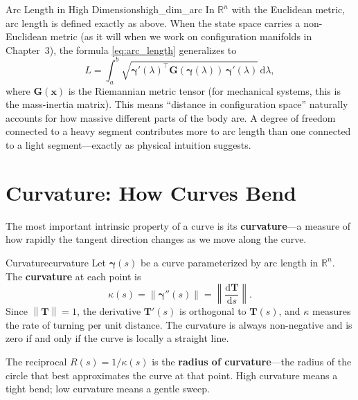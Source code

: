 \documentclass[12pt, openany]{book}
\theoremstyle{plain}
\newcommand{\state}{\bm{x}}
\newcommand{\traj}{\bm{\gamma}}
\newcommand{\Reals}{\mathbb{R}}
\newcommand{\dd}{\mathrm{d}}
\newcommand{\norm}[1]{\left\lVert #1 \right\rVert}
\newcommand{\tangent}{\bm{T}}
\begin{document}
\begin{remark}{Arc Length in High Dimensions}{high_dim_arc}
  In $\Reals^n$ with the Euclidean metric, arc length is defined exactly as
  above. When the state space carries a non-Euclidean metric (as it will when
  we work on configuration manifolds in Chapter~3), the formula
  \eqref{eq:arc_length} generalizes to
  \begin{equation}
    L = \int_a^b \sqrt{\traj'(\lambda)^\top \bm{G}(\traj(\lambda))\,
    \traj'(\lambda)} \, \dd\lambda,
  \end{equation}
  where $\bm{G}(\state)$ is the Riemannian metric tensor (for mechanical systems,
  this is the mass-inertia matrix). This means ``distance in configuration
  space'' naturally accounts for how massive different parts of the body are.
  A degree of freedom connected to a heavy segment contributes more to arc
  length than one connected to a light segment---exactly as physical intuition
  suggests.
\end{remark}

\section{Curvature: How Curves Bend}

The most important intrinsic property of a curve is its \textbf{curvature}---a
measure of how rapidly the tangent direction changes as we move along the curve.

\begin{definition}{Curvature}{curvature}
  Let $\traj(s)$ be a curve parameterized by arc length in $\Reals^n$. The
  \textbf{curvature} at each point is
  \begin{equation}\label{eq:curvature_def}
    \kappa(s) = \norm{\traj''(s)} = \norm{\frac{\dd\tangent}{\dd s}}.
  \end{equation}
  Since $\norm{\tangent} = 1$, the derivative $\tangent'(s)$ is orthogonal to
  $\tangent(s)$, and $\kappa$ measures the rate of turning per unit distance.
  The curvature is always non-negative and is zero if and only if the curve is
  locally a straight line.
\end{definition}

The reciprocal $R(s) = 1/\kappa(s)$ is the \textbf{radius of curvature}---the
radius of the circle that best approximates the curve at that point. High curvature
means a tight bend; low curvature means a gentle sweep.
\end{document}
